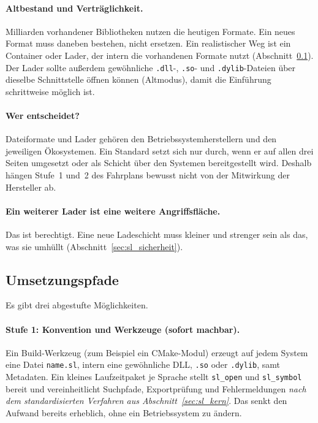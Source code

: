 \paragraph{Altbestand und Verträglichkeit.} Milliarden vorhandener Bibliotheken nutzen die heutigen Formate. Ein neues Format muss daneben bestehen, nicht ersetzen. Ein realistischer Weg ist ein Container oder Lader, der intern die vorhandenen Formate nutzt (Abschnitt~\ref{sec:sl_pfade}). Der Lader sollte außerdem gewöhnliche \texttt{.dll}-, \texttt{.so}- und \texttt{.dylib}-Dateien über dieselbe Schnittstelle öffnen können (\glqq Altmodus\grqq), damit die Einführung schrittweise möglich ist.

\paragraph{Wer entscheidet?} Dateiformate und Lader gehören den Betriebssystemherstellern und den jeweiligen Ökosystemen. Ein Standard setzt sich nur durch, wenn er auf allen drei Seiten umgesetzt oder als Schicht über den Systemen bereitgestellt wird. Deshalb hängen Stufe~1 und~2 des Fahrplans bewusst nicht von der Mitwirkung der Hersteller ab.

\paragraph{\glqq Ein weiterer Lader ist eine weitere Angriffsfläche.\grqq} Das ist berechtigt. Eine neue Ladeschicht muss kleiner und strenger sein als das, was sie umhüllt (Abschnitt~\ref{sec:sl_sicherheit}).

\subsection{Umsetzungspfade}
\label{sec:sl_pfade}

Es gibt drei abgestufte Möglichkeiten.

\paragraph{Stufe 1: Konvention und Werkzeuge (sofort machbar).} Ein Build-Werkzeug (zum Beispiel ein CMake-Modul) erzeugt auf jedem System eine Datei \texttt{name.sl}, intern eine gewöhnliche DLL, \texttt{.so} oder \texttt{.dylib}, samt Metadaten. Ein kleines Laufzeitpaket je Sprache stellt \texttt{sl\_open} und \texttt{sl\_symbol} bereit und vereinheitlicht Suchpfade, Exportprüfung und Fehlermeldungen \emph{nach dem standardisierten Verfahren aus Abschnitt~\ref{sec:sl_kern}}. Das senkt den Aufwand bereits erheblich, ohne ein Betriebssystem zu ändern.

